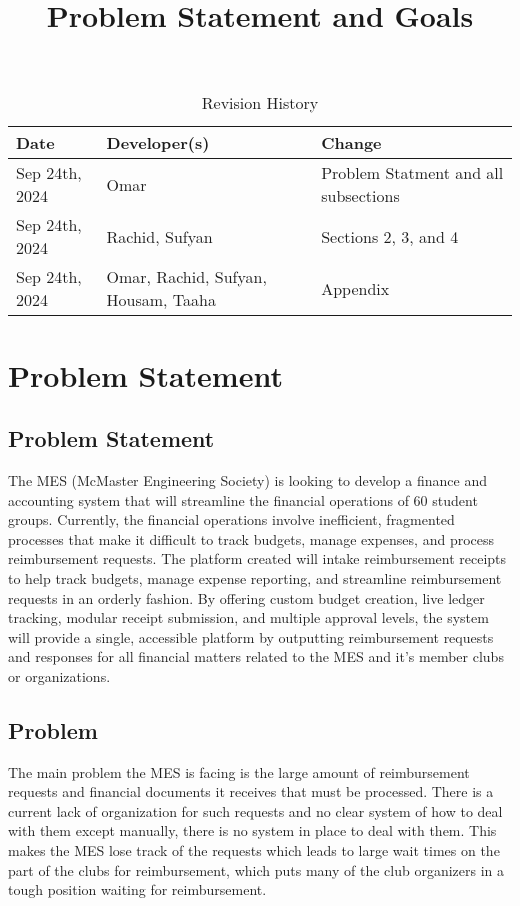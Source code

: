 \documentclass{article}
\title{Problem Statement and Goals\\\progname}
\author{\authname}
\date{}
\begin{document}
\maketitle

\begin{table}[hp]
\caption{Revision History} \label{TblRevisionHistory}
\begin{tabularx}{\textwidth}{llX}
\toprule
\textbf{Date} & \textbf{Developer(s)} & \textbf{Change}\\
\midrule
Sep 24th, 2024 & Omar & Problem Statment and all subsections \\
Sep 24th, 2024 & Rachid, Sufyan & Sections 2, 3, and 4 \\
Sep 24th, 2024 & Omar, Rachid, Sufyan, Housam, Taaha & Appendix \\
\bottomrule
\end{tabularx}
\end{table}

\section{Problem Statement}

\subsection{Problem Statement}

\hspace{0.5cm} The MES (McMaster Engineering Society) is looking to develop a finance and accounting system that will streamline the financial operations of 60 student groups. Currently, the financial operations involve inefficient, fragmented processes that make it difficult to track budgets, manage expenses, and process reimbursement requests. The platform created will intake reimbursement receipts to help track budgets, manage expense reporting, and streamline reimbursement requests in an orderly fashion. By offering custom budget creation, live ledger tracking, modular receipt submission, and multiple approval levels, the system will provide a single, accessible platform by outputting reimbursement requests and responses for all financial matters related to the MES and it's member clubs or organizations.

\subsection{Problem}

\hspace{0.5cm} The main problem the MES is facing is the large amount of reimbursement requests and financial documents it receives that must be processed. There is a current lack of organization for such requests and no clear system of how to deal with them except manually, there is no system in place to deal with them.
This makes the MES lose track of the requests which leads to large wait times on the part of the clubs for reimbursement, which puts many of the club organizers in a tough position waiting for reimbursement.  
\end{document}
